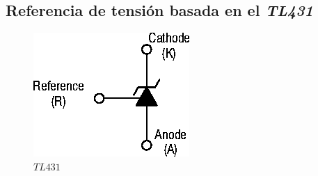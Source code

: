 
\subsection{Referencia de tensión basada en el \textit{TL431}}

\label{section:voltage_reference}


\begin{figure}
\begin{center}
\includegraphics[width=0.15 \textwidth, angle=0]{./img/voltage_reference/reference0.png}
\end{center}
\caption{\label{fig:fig_vref_cir_0}\footnotesize{$TL431$}}
\end{figure}




